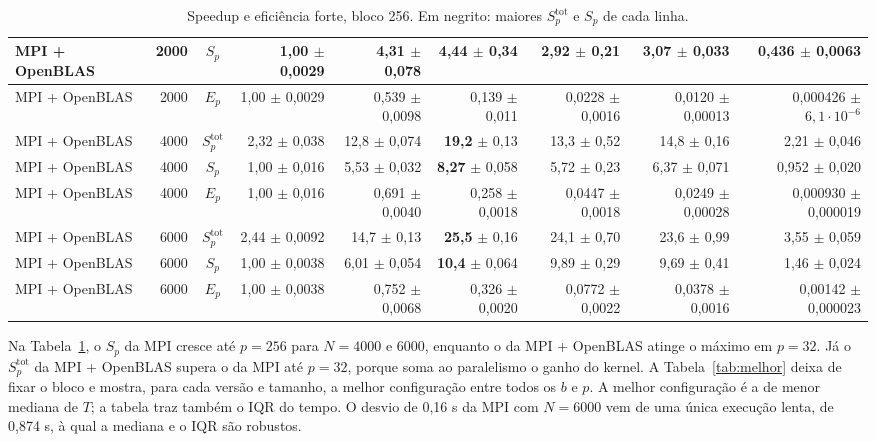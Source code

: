 \documentclass[Portugues]{ic-tese-v3}
\DeclareRobustCommand{\_}{\textunderscore\allowbreak} %
\begin{document}
\begin{table}[H]
\begin{tabular}{|l|r|c|r|r|r|r|r|r|}
MPI + OpenBLAS & 2000 & $S_p$ & 1,00 $\pm$ 0,0029 & 4,31 $\pm$ 0,078 & \textbf{4,44} $\pm$ 0,34 & 2,92 $\pm$ 0,21 & 3,07 $\pm$ 0,033 & 0,436 $\pm$ 0,0063 \\ \hline
MPI + OpenBLAS & 2000 & $E_p$ & 1,00 $\pm$ 0,0029 & 0,539 $\pm$ 0,0098 & 0,139 $\pm$ 0,011 & 0,0228 $\pm$ 0,0016 & 0,0120 $\pm$ 0,00013 & 0,000426 $\pm$ $6{,}1\cdot10^{-6}$ \\ \hline
MPI + OpenBLAS & 4000 & $S^{\mathrm{tot}}_p$ & 2,32 $\pm$ 0,038 & 12,8 $\pm$ 0,074 & \textbf{19,2} $\pm$ 0,13 & 13,3 $\pm$ 0,52 & 14,8 $\pm$ 0,16 & 2,21 $\pm$ 0,046 \\ \hline
MPI + OpenBLAS & 4000 & $S_p$ & 1,00 $\pm$ 0,016 & 5,53 $\pm$ 0,032 & \textbf{8,27} $\pm$ 0,058 & 5,72 $\pm$ 0,23 & 6,37 $\pm$ 0,071 & 0,952 $\pm$ 0,020 \\ \hline
MPI + OpenBLAS & 4000 & $E_p$ & 1,00 $\pm$ 0,016 & 0,691 $\pm$ 0,0040 & 0,258 $\pm$ 0,0018 & 0,0447 $\pm$ 0,0018 & 0,0249 $\pm$ 0,00028 & 0,000930 $\pm$ 0,000019 \\ \hline
MPI + OpenBLAS & 6000 & $S^{\mathrm{tot}}_p$ & 2,44 $\pm$ 0,0092 & 14,7 $\pm$ 0,13 & \textbf{25,5} $\pm$ 0,16 & 24,1 $\pm$ 0,70 & 23,6 $\pm$ 0,99 & 3,55 $\pm$ 0,059 \\ \hline
MPI + OpenBLAS & 6000 & $S_p$ & 1,00 $\pm$ 0,0038 & 6,01 $\pm$ 0,054 & \textbf{10,4} $\pm$ 0,064 & 9,89 $\pm$ 0,29 & 9,69 $\pm$ 0,41 & 1,46 $\pm$ 0,024 \\ \hline
MPI + OpenBLAS & 6000 & $E_p$ & 1,00 $\pm$ 0,0038 & 0,752 $\pm$ 0,0068 & 0,326 $\pm$ 0,0020 & 0,0772 $\pm$ 0,0022 & 0,0378 $\pm$ 0,0016 & 0,00142 $\pm$ 0,000023 \\ \hline
\end{tabular}
\caption{Speedup e eficiência forte, bloco 256. Em negrito: maiores $S^{\mathrm{tot}}_p$ e $S_p$ de cada linha.}
\label{tab:speedup}
\end{table}

Na Tabela~\ref{tab:speedup}, o $S_p$ da MPI cresce até $p=256$ para $N=4000$ e 6000, enquanto o da MPI + OpenBLAS atinge o máximo em $p=32$. Já o $S^{\mathrm{tot}}_p$ da MPI + OpenBLAS supera o da MPI até $p=32$, porque soma ao paralelismo o ganho do kernel. A Tabela~\ref{tab:melhor} deixa de fixar o bloco e mostra, para cada versão e tamanho, a melhor configuração entre todos os $b$ e $p$. A melhor configuração é a de menor mediana de $T$; a tabela traz também o IQR do tempo. O desvio de 0,16 s da MPI com $N=6000$ vem de uma única execução lenta, de 0,874 s, à qual a mediana e o IQR são robustos.
\end{document}
